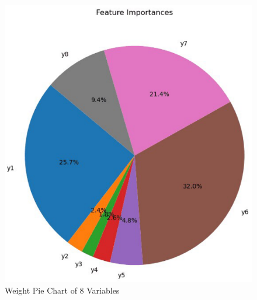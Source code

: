 \documentclass{mcmthesis}
\begin{document}
\begin{figure}[h]
\centering
\includegraphics[width=12cm]{figures/Snipaste_2024-02-06_04-27-43.png}
\caption{Weight Pie Chart of 8 Variables} \label{fig:aa}
\end{figure}
\end{document}
